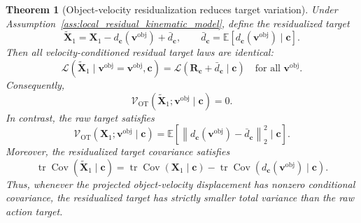 \documentclass[10pt,twocolumn,letterpaper]{article}
\newtheorem{theorem}{Theorem}
\begin{document}
\begin{theorem}[Object-velocity residualization reduces target variation]
\label{thm:velocity_residualization_reduces_variation}
Under Assumption~\ref{ass:local_residual_kinematic_model}, define the
residualized target
\begin{equation}
    \widetilde{\mathbf X}_1
    =
    \mathbf X_1
    -
    d_{\mathbf c}(\mathbf v^\text{obj})
    +
    \bar d_{\mathbf c},
    \qquad
    \bar d_{\mathbf c}
    =
    \mathbb E
    [
        d_{\mathbf c}(\mathbf v^\text{obj})
        \mid
        \mathbf c
    ].
    \label{eq:residualized_target_variance_analysis}
\end{equation}
Then all velocity-conditioned residual target laws are identical:
\begin{equation}
    \mathcal L
    \left(
        \widetilde{\mathbf X}_1
        \mid
        \mathbf v^\text{obj}=\mathbf v^\text{obj},
        \mathbf c
    \right)
    =
    \mathcal L
    \left(
        \mathbf R_{\mathbf c}
        +
        \bar d_{\mathbf c}
        \mid
        \mathbf c
    \right)
    \quad
    \text{for all } \mathbf v^\text{obj}.
    \label{eq:residual_laws_identical}
\end{equation}
Consequently,
\begin{equation}
    \mathcal V_{\mathrm{OT}}
    (
        \widetilde{\mathbf X}_1;
        \mathbf v^\text{obj}
        \mid
        \mathbf c
    )
    =
    0.
    \label{eq:residual_ot_zero}
\end{equation}
In contrast, the raw target satisfies
\begin{equation}
    \mathcal V_{\mathrm{OT}}
    (
        \mathbf X_1;
        \mathbf v^\text{obj}
        \mid
        \mathbf c
    )
    =
    \mathbb E
    \left[
        \left\|
            d_{\mathbf c}(\mathbf v^\text{obj})
            -
            \bar d_{\mathbf c}
        \right\|_2^2
        \mid
        \mathbf c
    \right].
    \label{eq:ot_variability_value}
\end{equation}
Moreover, the residualized target covariance satisfies
\begin{equation}
    \operatorname{tr}
    \operatorname{Cov}
    (
        \widetilde{\mathbf X}_1
        \mid
        \mathbf c
    )
    =
    \operatorname{tr}
    \operatorname{Cov}
    (
        \mathbf X_1
        \mid
        \mathbf c
    )
    -
    \operatorname{tr}
    \operatorname{Cov}
    (
        d_{\mathbf c}(\mathbf v^\text{obj})
        \mid
        \mathbf c
    ).
    \label{eq:covariance_reduction}
\end{equation}
Thus, whenever the projected object-velocity displacement has nonzero
conditional covariance, the residualized target has strictly smaller total
variance than the raw action target.
\end{theorem}
\end{document}
